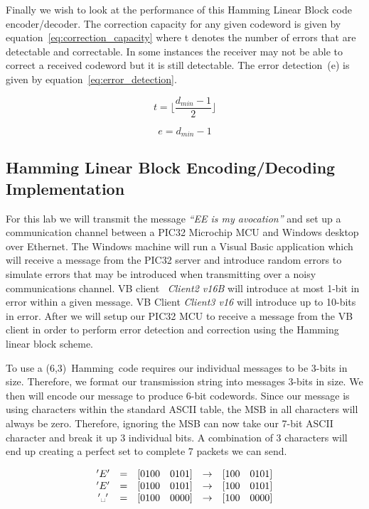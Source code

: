 \documentclass[12pt]{article}
\begin{document}
Finally we wish to look at the performance of this Hamming Linear Block code
encoder/decoder. The correction capacity for any given codeword is given by
equation~\ref{eq:correction_capacity} where t denotes the number of 
errors that are detectable and correctable. In some instances the receiver may
not be able to correct a received codeword but it is still detectable. 
The error detection~(e) is given by equation~\ref{eq:error_detection}.

\begin{equation}
    t=\lfloor{\frac{d_{min}-1}{2}}\rfloor
    \label{eq:correction_capacity}   
\end{equation}

\begin{equation}
    e={d_{min}-1}
    \label{eq:error_detection}   
\end{equation}

\subsection{Hamming Linear Block Encoding/Decoding Implementation}
\label{sec:implementation}
For this lab we will transmit the message \textit{``EE is my avocation''} 
and set up a communication channel between a PIC32 Microchip MCU and 
Windows desktop over Ethernet. The Windows machine will run a Visual Basic 
application which will receive a message from the PIC32 server and 
introduce random errors to simulate errors that may be introduced
when transmitting over a noisy communications channel. VB client \
\textit{Client2 v16B} will introduce at most 1-bit in error within a given
message. VB Client \textit{Client3 v16} will introduce up to 10-bits in 
error. After we will setup our PIC32 MCU to receive a message from the VB 
client in order to perform error detection and correction using the Hamming 
linear block scheme.

To use a (6,3)~Hamming~code requires our individual messages to be 3-bits in
size. Therefore, we format our transmission string into messages 3-bits in 
size. We then will encode our message to produce 6-bit codewords. Since
our message is using characters within the standard ASCII table, the MSB in 
all characters will always be zero. Therefore, ignoring the MSB can now take 
our 7-bit ASCII character and break it up 3 individual bits. A combination 
of 3 characters will end up creating a perfect set to complete 7 packets 
we can send. 

$$
    \begin{array}{ccccc}
        'E' & = & [ 0 1 0 0 \quad 0 1 0 1] 
                & \rightarrow & [ 1 0 0 \quad 0 1 0 1] \\
        'E' & = & [ 0 1 0 0 \quad 0 1 0 1] 
                & \rightarrow & [ 1 0 0 \quad 0 1 0 1] \\
        '\text{\textvisiblespace }' & = & [ 0 1 0 0 \quad 0 0 0 0] 
                                    & \rightarrow
                                    & [ 1 0 0 \quad 0 0 0 0 ]
    \end{array}
$$
\end{document}
